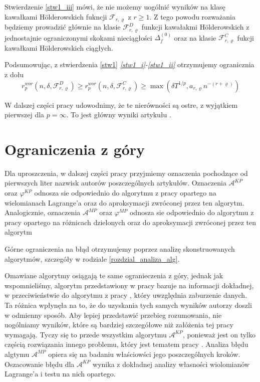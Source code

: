 \documentclass[oik, pdftex, robocza, man]{mgrwms}
\begin{document}
    Stwierdzenie \ref{stw1_iii} mówi, że nie możemy uogólnić wyników na klasę kawałkami Hölderowskich fukncji $\mathcal{F}_{r,\varrho}$ z $r \geq 1$. Z tego powodu rozważania będziemy prowadzić głównie na klasie $\mathcal{F}_{r,\varrho}^{D}$ funkcji kawałakmi Hölderowskich z jednostajnie ograniczonymi skokami nieciągłości $\Delta_{f}^{(0)}$ oraz na klasie $\mathcal{F}_{r,\varrho}^{C}$ fukcji kawałkami Hölderowskich ciągłych.

    Podsumowując, z stwierdzenia \ref{stw1} \textit{\ref{stw1_i}-\ref{stw1_ii}} otrzymujemy ogranicznia z dołu
    \begin{equation*}
        r^{wor}_{p}(n, \delta, \mathcal{F}^{D}_{r,\varrho}) \geq r^{wor}_{p}(n, \delta, \mathcal{F}^{C}_{r,\varrho}) \geq \max(\delta T^{1/p}, a_{r,\varrho} n^{-(r+\varrho)})
    \end{equation*}

    W dalszej części pracy udowodnimy, że te nierówności są ostre, z wyjątkiem pierwszej dla $p=\infty$. To jest główny wyniki artykułu \cite{AoP}.


\section{Ograniczenia z góry}


    Dla uproszczenia, w dalszej części pracy przyjmiemy oznaczenia pochodzące od pierwszych liter nazwisk autorów poszczególnych artykułów. Oznaczenia $\mathcal{A}^{KP}$ oraz $\varphi^{KP}$ odnosza sie odpowiednio do algorytmu z pracy \cite{CoDF} opartego na wielomianach Lagrange'a oraz do aproksymacji zwróconej przez ten algorytm. Analogicznie, oznaczenia $\mathcal{A}^{MP}$ oraz $\varphi^{MP}$ odnosza sie odpowiednio do algorytmu z pracy \cite{AoP} opartego na różnicach dzielonych oraz do aproksymacji zwróconej przez ten algorytm

    Górne ograniczenia na błąd otrzymujemy poprzez analizę skonstruowanych algorytmów, szczegóły w rodziale \ref{rozdzial_analiza_alg}.
    
    Omawiane algorytmy osiągają te same ogranieczenia z góry, jednak jak wspomnieliśmy, algorytm przedstawiony w pracy \cite{CoDF} bazuje na informacji dokładnej, w przeciwieństwie do algorytmu z pracy \cite{AoP}, który uwzględnia zaburzenie danych. Ta różnica wpłynęła na to, że do uzyskania tych samych wyników autorzy doszli w odmienny sposób. Aby lepiej przedstawić przebieg rozumowania, nie uogólniamy wyników, które są bardziej szczegółowe niż załóżenia tej pracy wymagają. Tyczy się to przede wszystkim algorytmu $\mathcal{A}^{KP}$, ponieważ jest on tylko częścią rozwiązania innego problemu, który jest tematem pracy \cite{CoDF}. Analiza błędu algtymu $\mathcal{A}^{MP}$ opiera się na badaniu właściowści jego poszczególnych kroków. Oszacowanie błędu dla $\mathcal{A}^{KP}$ wynika z dokładnej analizy własności wiolomianów Lagrange'a i testu na nich opartego.
\end{document}
